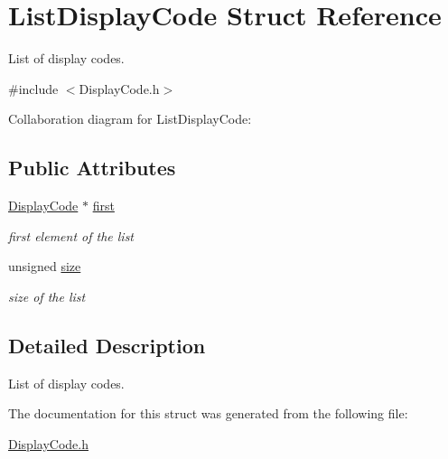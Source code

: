\hypertarget{structListDisplayCode}{}\section{List\+Display\+Code Struct Reference}
\label{structListDisplayCode}


List of display codes.  




{\ttfamily \#include $<$Display\+Code.\+h$>$}



Collaboration diagram for List\+Display\+Code\+:
\subsection*{Public Attributes}
\begin{DoxyCompactItemize}
\item 
\hyperlink{structDisplayCode}{Display\+Code} $\ast$ \hyperlink{structListDisplayCode_a99e86ef649bd63f7229f45a1de400f3a}{first}\hypertarget{structListDisplayCode_a99e86ef649bd63f7229f45a1de400f3a}{}\label{structListDisplayCode_a99e86ef649bd63f7229f45a1de400f3a}

\begin{DoxyCompactList}\small\item\em first element of the list \end{DoxyCompactList}\item 
unsigned \hyperlink{structListDisplayCode_a996383aabad4d02cd3d9543143b6e72a}{size}\hypertarget{structListDisplayCode_a996383aabad4d02cd3d9543143b6e72a}{}\label{structListDisplayCode_a996383aabad4d02cd3d9543143b6e72a}

\begin{DoxyCompactList}\small\item\em size of the list \end{DoxyCompactList}\end{DoxyCompactItemize}


\subsection{Detailed Description}
List of display codes. 

The documentation for this struct was generated from the following file\+:\begin{DoxyCompactItemize}
\item 
\hyperlink{DisplayCode_8h}{Display\+Code.\+h}\end{DoxyCompactItemize}

